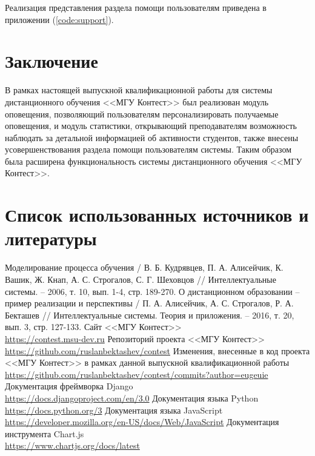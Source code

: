 \documentclass[12pt, a4paper, oneside]{article}
\begin{document}
Реализация представления раздела помощи пользователям приведена в приложении (\ref{code:support}).
\newpage

\section{Заключение}
В рамках настоящей выпускной квалификационной работы для системы дистанционного обучения <<МГУ Контест>> был реализован модуль оповещения, позволяющий пользователям персонализировать получаемые оповещения, и модуль статистики, открывающий преподавателям возможность наблюдать за детальной информацией об активности студентов, также внесены усовершенствования раздела помощи пользователям системы. Таким образом была расширена функциональность системы дистанционного обучения <<МГУ Контест>>.
\newpage

\section{Список использованных источников и литературы}
\begingroup
\renewcommand{\section}[2]{}
\begin{thebibliography}{20}
    Моделирование процесса обучения / В. Б. Кудрявцев, П. А. Алисейчик, К. Вашик, Ж. Кнап, А. С. Строгалов, С. Г. Шеховцов // Интеллектуальные системы. – 2006, т. 10, вып. 1-4, стр. 189-270.
    О дистанционном образовании – пример реализации и перспективы / П. А. Алисейчик, А. С. Строгалов, Р. А. Бекташев // Интеллектуальные системы. Теория и приложения. – 2016, т. 20, вып. 3, стр. 127-133.
    Сайт <<МГУ Контест>>\\
    \url{https://contest.msu-dev.ru}
    Репозиторий проекта <<МГУ Контест>>\\
    \url{https://github.com/ruslanbektashev/contest}
    Изменения, внесенные в код проекта <<МГУ Контест>> в рамках данной выпускной квалификационной работы\\
    \url{https://github.com/ruslanbektashev/contest/commits?author=eugeuie}
    Документация фреймворка Django\\
    \url{https://docs.djangoproject.com/en/3.0}
    Документация языка Python\\
    \url{https://docs.python.org/3}
    Документация языка JavaScript\\
    \url{https://developer.mozilla.org/en-US/docs/Web/JavaScript}
    Документация инструмента Chart.js\\
    \url{https://www.chartjs.org/docs/latest}
\end{thebibliography}
\endgroup
\newpage
\end{document}
